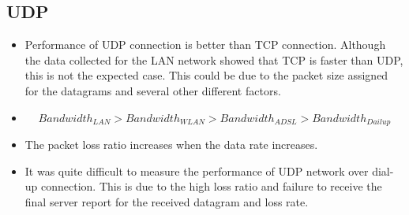 \documentclass[aps,letterpaper,10pt]{revtex4}
\begin{document}
        \subsection{UDP}    
            \begin{figure}[htp]
                    \begin{center}
                    \end{center}    
                \end{figure}   
            \begin{center}
                \begin{itemize}
                    \item Performance of UDP connection is better than TCP connection. Although the data collected for the LAN network showed that TCP is faster than UDP, this is not the expected case. This could be due to the packet size assigned for the datagrams and several other different factors.
                    \item \[ Bandwidth_{LAN} > Bandwidth_{WLAN} > Bandwidth_{ADSL} > Bandwidth_{Dail up}\]
                    \item The packet loss ratio increases when the data rate increases.
		  \item It was quite difficult to measure the performance of UDP network over dial-up connection. This is due to the high loss ratio and failure to receive the final server report for the received datagram and loss rate.
                \end{itemize}
            \end{center}
                
                

\end{document}
